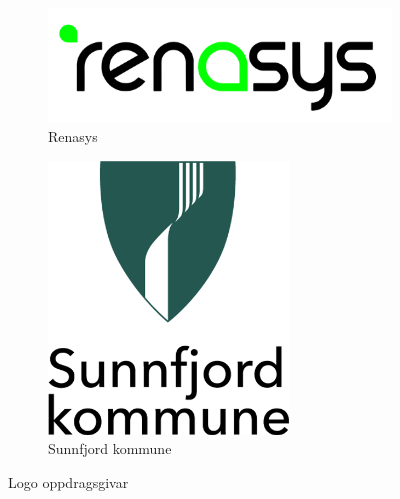 \begin{figure}[htbp]
    \centering
    \begin{subfigure}[b]{0.3\textwidth}
        \centering
        \includegraphics[width=1\textwidth]{Bilder/renasys.png}
        \caption{Renasys}\label{fig:subfig1}
    \end{subfigure}
    \hfill
    \begin{subfigure}[b]{0.3\textwidth}
        \centering
        \includegraphics[width=0.7\textwidth]{Bilder/SK.png}
        \caption{Sunnfjord kommune}\label{fig:subfig2}
    \end{subfigure}
    \caption{Logo oppdragsgivar}\label{fig:Illustrasjon-Diffuser}
\end{figure}